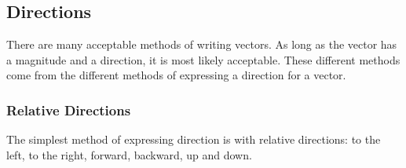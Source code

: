             \subsection*{Directions}
            \nopagebreak
      \label{m38812*id187219}There are many acceptable methods of writing vectors. As long as the vector has a magnitude and a direction, it is most likely acceptable. These different methods come from the different methods of expressing a direction for a vector.\par 
      \label{m38812*uid5}
            \subsubsection*{Relative Directions}
            \nopagebreak
        \label{m38812*id187233}The simplest method of expressing direction is with relative directions: to the left, to the right, forward, backward, up and down.\par 
      \label{m38812*uid6}
